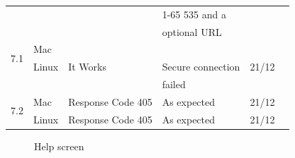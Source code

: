 \documentclass[a4paper, 12pt]{article}
\newcommand{\cmark}{\ding{51}}%
\newcommand{\xmark}{\ding{55}}%
\begin{document}
\begin{tabular}{| c | l | l | l | l | c |}
							&				&									& 1-65 535 and a	&					&				\\
							&				&									& optional URL		&					&				\\ \hline
\multirow{2}{*}{7.1}	& Mac		&									&							&					&				\\ \cline{2-6}
							& Linux		& It Works						& Secure connection& 21/12		& \xmark	\\ 
							&				&									& failed					&					&				\\ \hline
\multirow{2}{*}{7.2}	& Mac		& Response Code 405	& As expected		& 21/12			& \cmark	\\ \cline{2-6}
							& Linux		& Response Code 405	& As expected		& 21/12			& \cmark	\\ \hline	


\end{tabular}
\begin{figure}

\caption{Help screen}
\label{HSc}
\end{figure}
\newpage
\end{document}

